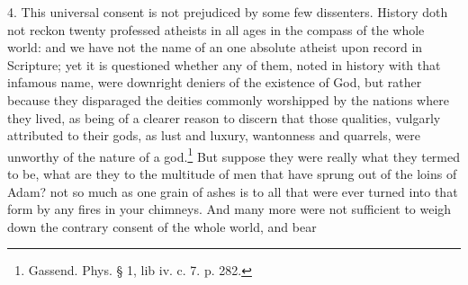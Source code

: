 \documentclass[a5paper]{book}
\begin{document}
4. This universal consent is not prejudiced by some few dissenters.
History doth not reckon twenty professed atheists in all ages 
    in the compass of the whole world: 
    and we have not the name of an one absolute atheist 
    upon record in Scripture; 
    yet it is questioned whether any of them, 
    noted in history with that infamous name, 
    were downright deniers of the existence of God, 
    but rather because they disparaged the deities commonly worshipped 
    by the nations where they lived, 
    as being of a clearer reason to discern that those qualities,
    vulgarly attributed to their gods, 
    as lust and luxury, 
    wantonness and quarrels, 
    were unworthy of the nature of a god.\footnote{Gassend. Phys. § 1, lib iv. c. 7. p. 282.}
But suppose they were really what they termed to be, 
    what are they to the multitude of men 
    that have sprung out of the loins of Adam? 
    not so much as one grain of ashes 
    is to all that were ever turned into that form by any fires in your chimneys. 
And many more were not sufficient
    to weigh down the contrary consent of the whole world, 
    and bear
\end{document}
